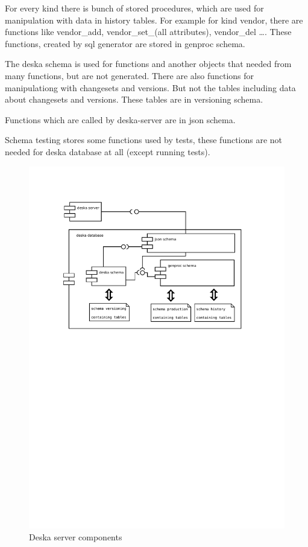 \documentclass[deska]{subfiles}
\begin{document}
For every kind there is bunch of stored procedures, which are used for manipulation with data in history tables. For example for kind vendor, there are functions like vendor\_add, vendor\_set\_(all attributes), vendor\_del ….
These functions, created by sql generator are stored in genproc schema.

The deska schema is used for functions and another objects that needed from many functions, but are not generated. There are also functions for manipulationg with changesets and versions.
But not the tables including data about changesets and versions. These tables are in versioning schema.

Functions which are called by deska-server are in json schema.

Schema testing stores some functions used by tests, these functions are not needed for deska database at all (except running tests).
\begin{figure}[h]
	\centering
	\includegraphics[trim=28mm 170mm 30mm 28mm]{img-deska-server-components.pdf}
	\caption{Deska server components}
\end{figure}
\end{document}
